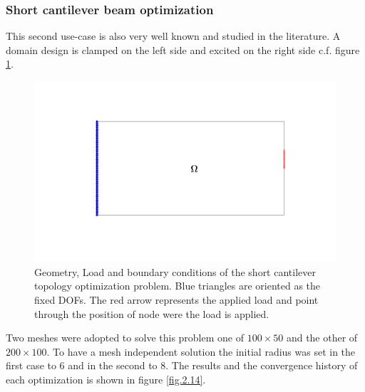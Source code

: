 \subsubsection{Short cantilever beam optimization}
This second use-case is also very well known and studied in the literature. A domain design is clamped on the left side and excited on the right side c.f. figure \ref{fig.2.13}.
\begin{figure}[ht]
\centering
\includegraphics[width=\textwidth]{images/Ch2/design_problem2}
\caption{Geometry, Load and boundary conditions of the short cantilever topology optimization problem. Blue triangles are oriented as the fixed DOFs. The red arrow represents the applied load and point through the position of node were the load is applied.}
\label{fig.2.13}
\end{figure}
Two meshes were adopted to solve this problem one of $100\times50$ and the other of $200\times100$. To have a mesh independent solution the initial radius was set in the first case to 6 and in the second to 8. The results and the convergence history of each optimization is shown in figure \ref{fig.2.14}. 
